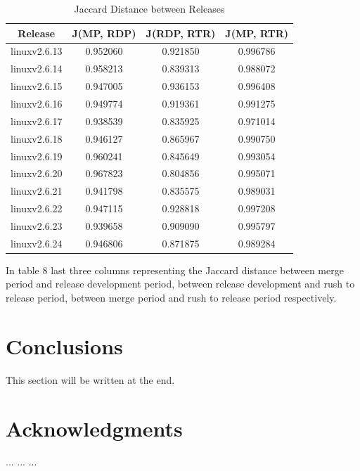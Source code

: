 \documentclass{acm_proc_article-sp}
\begin{document}
\begin{table}[ht]
\caption{Jaccard Distance between Releases}  %
\centering 						%
\begin{tabular}{c c c c}				%
\hline\hline						%
Release 				& J(MP, RDP)		& J(RDP, RTR)	& J(MP, RTR)	\\ [0.5ex]
\hline 							%
linuxv2.6.13			& 0.952060		& 0.921850		& 0.996786 \\
linuxv2.6.14			& 0.958213		& 0.839313		& 0.988072 \\
linuxv2.6.15			& 0.947005		& 0.936153		& 0.996408 \\
linuxv2.6.16			& 0.949774		& 0.919361 		& 0.991275 \\
linuxv2.6.17			& 0.938539		& 0.835925 		& 0.971014 \\
linuxv2.6.18			& 0.946127		& 0.865967		& 0.990750 \\
linuxv2.6.19			& 0.960241		& 0.845649 		& 0.993054 \\
linuxv2.6.20			& 0.967823		& 0.804856 		& 0.995071 \\
linuxv2.6.21			& 0.941798		& 0.835575 		& 0.989031 \\
linuxv2.6.22			& 0.947115		& 0.928818 		& 0.997208 \\
linuxv2.6.23			& 0.939658		& 0.909090 		& 0.995797 \\
linuxv2.6.24			& 0.946806		& 0.871875 		& 0.989284 \\
[1ex]							%
\hline 							%
\end{tabular}
\label{table:nonlin} 				%
\end{table}

In table 8 last three columns representing the Jaccard distance between merge period and release development period, between release development and rush to release period, between merge period and rush to release period respectively.

\section{Conclusions}
This section will be written at the end.

\section{Acknowledgments}
... ... ...

 
\appendix
\end{document}
